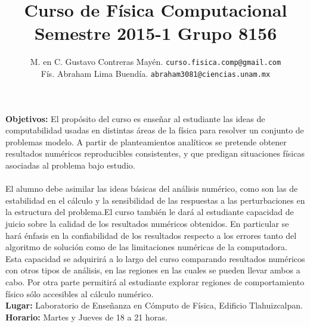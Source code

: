 \documentclass[12pt]{article}
\author{M. en C. Gustavo Contreras Mayén. \texttt{curso.fisica.comp@gmail.com}\\
Fís. Abraham Lima Buendía. \texttt{abraham3081@ciencias.unam.mx}}
\title{Curso de Física Computacional\\{\large Semestre 2015-1 Grupo 8156}}
\date{ }
\begin{document}
\renewcommand\labelenumii{\theenumi.{\arabic{enumii}}}
\maketitle
\fontsize{12}{12}\selectfont
\textbf{Objetivos:}
El propósito del curso es enseñar al estudiante las ideas de computabilidad usadas en distintas áreas de la  física para resolver un conjunto de problemas modelo. A partir de planteamientos analíticos se pretende obtener resultados numéricos reproducibles consistentes, y que predigan situaciones físicas asociadas al problema bajo estudio.
\\
\\
El alumno debe asimilar las ideas básicas del análisis numérico, como son las de estabilidad en el cálculo y la sensibilidad de las respuestas a las perturbaciones en la estructura del problema.El curso también le dará al estudiante capacidad de juicio sobre la calidad de los resultados numéricos obtenidos. En particular se hará énfasis en la confiabilidad de los resultados respecto a los errores tanto del algoritmo de solución como de las limitaciones numéricas de la computadora. Esta capacidad se adquirirá a lo largo del curso comparando resultados numéricos con otros tipos de análisis, en las regiones en las cuales se pueden llevar ambos a cabo. Por otra parte permitirá al estudiante explorar regiones de comportamiento físico sólo accesibles al cálculo numérico.
\\
\textbf{Lugar: }Laboratorio de Enseñanza en Cómputo de Física, Edificio Tlahuizcalpan.
\\
\textbf{Horario: } Martes y Jueves de 18 a 21 horas.
\\
\end{document}
